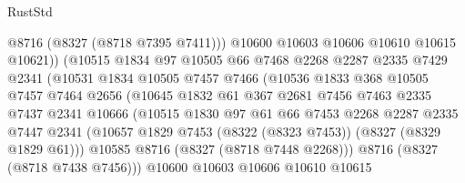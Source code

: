 \begin{lexlean}{RustStd}
\begin{coremodule}
                              @8716
                              (@8327 (@8718 @7395 @7411)))
                            @10600
                            @10603
                            @10606
                            @10610
                            @10615
                            @10621))
                        (@10515
                          @1834
                          @97
                          @10505
                          @66
                          @7468
                          @2268
                          @2287
                          @2335
                          @7429
                          @2341
                          (@10531
                            @1834
                            @10505
                            @7457
                            @7466
                            (@10536
                              @1833
                              @368
                              @10505
                              @7457
                              @7464
                              @2656
                              (@10645
                                @1832
                                @61
                                @367
                                @2681
                                @7456
                                @7463
                                @2335
                                @7437
                                @2341
                                @10666
                                (@10515
                                  @1830
                                  @97
                                  @61
                                  @66
                                  @7453
                                  @2268
                                  @2287
                                  @2335
                                  @7447
                                  @2341
                                  (@10657
                                    @1829
                                    @7453
                                    (@8322 (@8323 @7453))
                                    (@8327 (@8329 @1829 @61)))
                                  @10585
                                  @8716
                                  (@8327 (@8718 @7448 @2268)))
                                @8716
                                (@8327 (@8718 @7438 @7456)))
                              @10600
                              @10603
                              @10606
                              @10610
                              @10615

\end{coremodule}
\end{lexlean}
